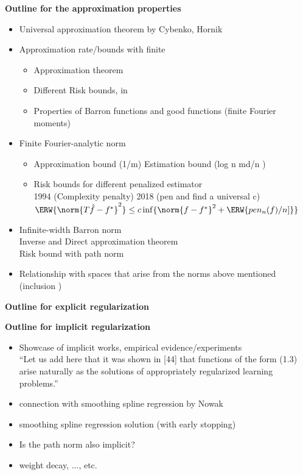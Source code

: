 \textbf{Outline for the approximation properties}
\begin{itemize}
    \item Universal approximation theorem by Cybenko, Hornik
    \item Approximation rate/bounds with finite
    \begin{itemize}
        \item Approximation theorem
        \item Different Risk bounds, in \cite{barronApproximationEstimationBounds1994, klusowskiRiskBoundsHighdimensional2018}
        \item Properties of Barron functions and good functions (finite Fourier moments)
    \end{itemize}
    \item Finite Fourier-analytic norm
    \begin{itemize}
        \item Approximation bound (1/m) Estimation bound (log n  md/n )
        \item Risk bounds for different penalized estimator \\
        1994 (Complexity penalty) 2018 (pen and find a universal c) \\
        $\ERW{\norm{T\hat{f} - f^*}^2} \leq c \inf\{\norm{f - f^*}^2 + \ERW{pen_n(f)/n]}\}$
    \end{itemize}
    \item Infinite-width Barron norm \\
    Inverse and Direct approximation theorem \\
    Risk bound with path norm 
    \item Relationship with spaces that arise from the norms above mentioned (inclusion )
\end{itemize}

\textbf{Outline for explicit regularization}

\textbf{Outline for implicit regularization}
\begin{itemize}
    \item Showcase of implicit works, empirical evidence/experiments \\
    ``Let us add here that it was shown in [44] that functions of the form (1.3) arise naturally as the solutions of appropriately regularized learning problems.''
    \item connection with smoothing spline regression by Nowak
    \item smoothing spline regression solution (with early stopping)
    \item Is the path norm also implicit?
    \item weight decay, ..., etc.
\end{itemize}


